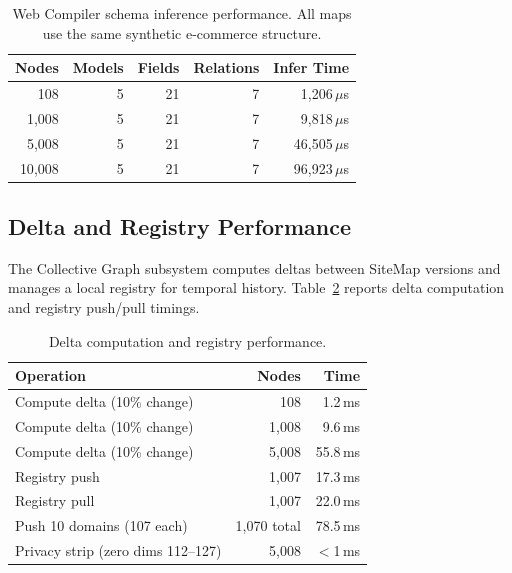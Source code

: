 \documentclass[10pt, twocolumn]{article}
\begin{document}
\begin{table}[t]
\caption{Web Compiler schema inference performance. All maps use the same synthetic e-commerce structure.}
\label{tab:compiler}
\centering
\small
\begin{tabular}{@{}rrrrr@{}}
\toprule
\textbf{Nodes} & \textbf{Models} & \textbf{Fields} & \textbf{Relations} & \textbf{Infer Time} \\
\midrule
108 & 5 & 21 & 7 & 1{,}206\,$\mu$s \\
1{,}008 & 5 & 21 & 7 & 9{,}818\,$\mu$s \\
5{,}008 & 5 & 21 & 7 & 46{,}505\,$\mu$s \\
10{,}008 & 5 & 21 & 7 & 96{,}923\,$\mu$s \\
\bottomrule
\end{tabular}
\end{table}


\subsection{Delta and Registry Performance}
\label{sec:deltaeval}

The Collective Graph subsystem computes deltas between SiteMap versions and manages a local registry for temporal history. Table~\ref{tab:delta} reports delta computation and registry push/pull timings.

\begin{table}[t]
\caption{Delta computation and registry performance.}
\label{tab:delta}
\centering
\small
\begin{tabular}{@{}lrr@{}}
\toprule
\textbf{Operation} & \textbf{Nodes} & \textbf{Time} \\
\midrule
Compute delta (10\% change) & 108 & 1.2\,ms \\
Compute delta (10\% change) & 1{,}008 & 9.6\,ms \\
Compute delta (10\% change) & 5{,}008 & 55.8\,ms \\
\midrule
Registry push & 1{,}007 & 17.3\,ms \\
Registry pull & 1{,}007 & 22.0\,ms \\
Push 10 domains (107 each) & 1{,}070 total & 78.5\,ms \\
\midrule
Privacy strip (zero dims 112--127) & 5{,}008 & $<$1\,ms \\
\bottomrule
\end{tabular}
\end{table}
\end{document}
